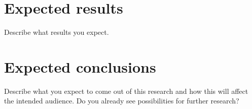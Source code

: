 \documentclass[fleqn,10pt]{artikeltin}
\begin{document}
\section{Expected results}
\label{sec:expected_results}

Describe what results you expect.

\section{Expected conclusions}
\label{sec:expected_conclusions}

Describe what you expect to come out of this research and how this will affect the intended audience. Do you already see possibilities for further research?


\printbibliography[heading=bibintoc]
\end{document}
